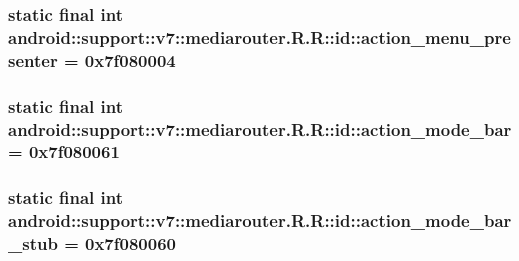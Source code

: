 \hypertarget{classandroid_1_1support_1_1v7_1_1mediarouter_1_1_r_1_1id_75eae20f1276f3ae08148d951d50e0c1}{
\subsubsection[{action\_\-menu\_\-presenter}]{\setlength{\rightskip}{0pt plus 5cm}static final int android::support::v7::mediarouter.R.R::id::action\_\-menu\_\-presenter = 0x7f080004}}
\label{classandroid_1_1support_1_1v7_1_1mediarouter_1_1_r_1_1id_75eae20f1276f3ae08148d951d50e0c1}


\hypertarget{classandroid_1_1support_1_1v7_1_1mediarouter_1_1_r_1_1id_e410f5c48a7374a0e13fe882ef80e129}{
\subsubsection[{action\_\-mode\_\-bar}]{\setlength{\rightskip}{0pt plus 5cm}static final int android::support::v7::mediarouter.R.R::id::action\_\-mode\_\-bar = 0x7f080061}}
\label{classandroid_1_1support_1_1v7_1_1mediarouter_1_1_r_1_1id_e410f5c48a7374a0e13fe882ef80e129}


\hypertarget{classandroid_1_1support_1_1v7_1_1mediarouter_1_1_r_1_1id_d582e35c91f1548ae1632ea019944675}{
\subsubsection[{action\_\-mode\_\-bar\_\-stub}]{\setlength{\rightskip}{0pt plus 5cm}static final int android::support::v7::mediarouter.R.R::id::action\_\-mode\_\-bar\_\-stub = 0x7f080060}}
\label{classandroid_1_1support_1_1v7_1_1mediarouter_1_1_r_1_1id_d582e35c91f1548ae1632ea019944675}


